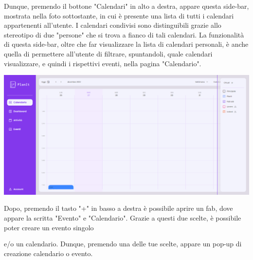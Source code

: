 Dunque, premendo il bottone "Calendari" in alto a destra, appare questa side-bar, mostrata nella foto sottostante, in cui è presente una lista di tutti i calendari appartenenti all'utente. I calendari condivisi sono distinguibili grazie allo stereotipo di due "persone" che si trova a fianco di tali calendari. La funzionalità di questa side-bar, oltre che far visualizzare la lista di calendari personali, è anche quella di permettere all'utente di filtrare, spuntandoli, quale calendari visualizzare, e quindi i rispettivi eventi, nella pagina "Calendario".

\begin{center}
    \includegraphics[width=1\textwidth, height=0.3\textheight]{img/png/FrontEnd/Calendario/calendario_calendari.png}
\end{center}

Dopo, premendo il tasto "+" in basso a destra è possibile aprire un fab, dove appare la scritta "Evento" e "Calendario". Grazie a questi due scelte, è possibile poter creare un evento singolo

e/o un calendario. Dunque, premendo una delle tue scelte, appare un pop-up di creazione calendario o evento.

